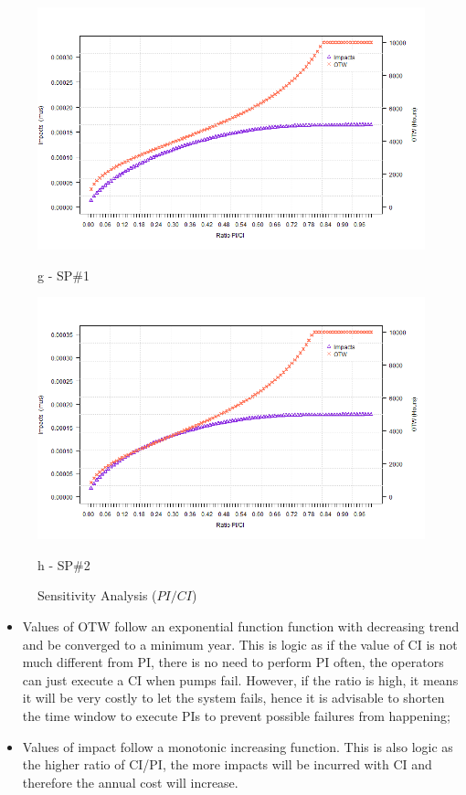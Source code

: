 \begin{figure}[!htb]
	\hspace{0.05cm}
	\begin{minipage}[b]{0.5\linewidth}
		\centering
		\includegraphics[width=\textwidth]{figures/ch05_fig_sacipi_pump5}
		\caption*{g -  SP\#1}
	\end{minipage}
	\hspace{0.05cm}
	\begin{minipage}[b]{0.5\linewidth}
		\centering
		\includegraphics[width=\textwidth]{figures/ch05_fig_sacipi_pump6}
		\caption*{h - SP\#2}
	\end{minipage}
	\caption{Sensitivity Analysis ($PI/CI$)}
	\label{ch05_fig_sa_cipi}
\end{figure}

\begin{itemize}
	\item Values of OTW follow an exponential function function with decreasing trend and be converged to a minimum year. This is logic as if the value of CI is not much different from PI, there is no need to perform PI often, the operators can just execute a CI when pumps fail. However, if the ratio is high, it means it will be very costly to let the system fails, hence it is advisable to shorten the time window to execute PIs to prevent possible failures from happening;

	\item Values of impact follow a monotonic increasing function. This is also logic as the higher ratio of CI/PI, the more impacts will be incurred with CI and therefore the annual cost will increase.
\end{itemize}

